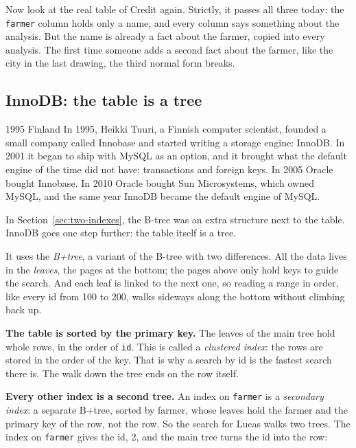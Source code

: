 Now look at the real table of Credit again. Strictly, it passes all three
today: the \texttt{farmer} column holds only a name, and every column says
something about the analysis. But the name is already a fact about the
farmer, copied into every analysis. The first time someone adds a second fact
about the farmer, like the city in the last drawing, the third normal form
breaks.

\subsection*{InnoDB: the table is a tree}

\begin{history}{1995 \textperiodcentered{} Finland}
In 1995, Heikki Tuuri, a Finnish computer scientist, founded a small company
called Innobase and started writing a storage engine: InnoDB. In 2001 it
began to ship with MySQL as an option, and it brought what the default
engine of the time did not have: transactions and foreign keys. In 2005
Oracle bought Innobase. In 2010 Oracle bought Sun Microsystems, which owned
MySQL, and the same year InnoDB became the default engine of MySQL.
\end{history}

In Section~\ref{sec:two-indexes}, the B-tree was an extra structure next to
the table. InnoDB goes one step
further: the table itself is a tree.

It uses the \emph{B+tree}, a variant of the B-tree with two differences. All
the data lives in the \emph{leaves}, the pages at the bottom; the pages
above only hold keys to guide the search. And each leaf is linked to the
next one, so reading a range in order, like every id from 100 to 200, walks
sideways along the bottom without climbing back up.

\textbf{The table is sorted by the primary key.} The leaves of the main tree
hold whole rows, in the order of \texttt{id}. This is called a
\emph{clustered index}: the rows are stored in the order of the key. That is
why a search by id is the fastest search there is. The walk down the tree
ends on the row itself.

\textbf{Every other index is a second tree.} An index on \texttt{farmer} is
a \emph{secondary index}: a separate B+tree, sorted by farmer, whose leaves
hold the farmer and the primary key of the row, not the row. So the search
for Lucas walks two trees. The index on \texttt{farmer} gives the id, 2, and
the main tree turns the id into the row:

